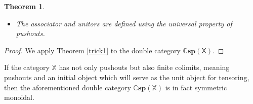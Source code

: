 \documentclass[oneside,final]{ucr}
\newtheorem{theorem}{Theorem}[section]
\theoremstyle{definition}
\newcommand{\lX}{\mathbb{X}}
\newcommand{\X}{\mathsf{X}}
\begin{document}
{\begin{theorem}
\begin{itemize}
\[\begin{tikzpicture}[scale=1.5]
(F') edge node[below]{$o''$} (G');
\end{tikzpicture}
\]
is given by
\[
\begin{tikzpicture}[scale=1.5]
\node (E) at (3,0) {$L(a)$};
\node (G) at (4,0) {$y$};
\node (F) at (5,0) {$L(b)$};
\node (E') at (3,-1) {$L(a'')$};
\node (G') at (4,-1) {$y''$};
\node (F') at (5,-1) {$L(b'')$.};
\path[->,font=\scriptsize,>=angle 90]
(E) edge node[left]{$L(\alpha'\alpha)$} (E')
(F) edge node[right]{$L(\beta'\beta)$} (F')
(G) edge node[left]{$f' f$} (G')
(E) edge node[above]{$i$} (G)
(F) edge node[above]{$o$} (G)
(E') edge node[below]{$i''$} (G')
(F') edge node[below]{$o''$} (G');
\end{tikzpicture}
\]
\item The associator and unitors are defined using the universal property of pushouts.
\end{itemize}
\end{theorem}

\begin{proof}
We apply Theorem \ref{trick1} to the double category $\mathbb{C} \mathbf{sp}(\X)$.
\end{proof}

If the category $\lX$ has not only pushouts but also finite colimits, meaning pushouts and an initial object which will serve as the unit object for tensoring, then the aforementioned double category $\mathbb{C}\mathbf{sp}(\lX)$ is in fact symmetric monoidal.

}
\end{document}
